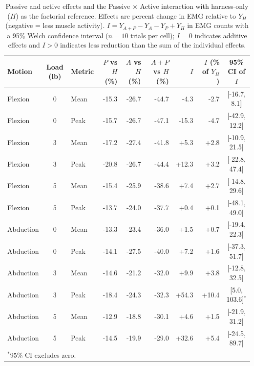 \begin{table}[H]
\centering
\caption{Passive and active effects and the Passive $\times$ Active interaction with harness-only ($H$) as the factorial reference. Effects are percent change in EMG relative to $Y_H$ (negative = less muscle activity). $I = Y_{A+P} - Y_{A} - Y_{P} + Y_{H}$ in EMG counts with a 95\% Welch confidence interval ($n = 10$ trials per cell); $I = 0$ indicates additive effects and $I > 0$ indicates less reduction than the sum of the individual effects.}
\label{tab:interaction}
\footnotesize
\setlength{\tabcolsep}{4pt}
\begin{tabular}{l c l r r r r r c}
\hline
Motion & Load (lb) & Metric & $P$ vs $H$ (\%) & $A$ vs $H$ (\%) & $A{+}P$ vs $H$ (\%) & $I$ & $I$ (\% of $Y_H$) & 95\% CI of $I$ \\
\hline
Flexion & 0 & Mean & -15.3 & -26.7 & -44.7 & -4.3 & -2.7 & [-16.7, 8.1] \\
Flexion & 0 & Peak & -15.7 & -26.7 & -47.1 & -15.3 & -4.7 & [-42.9, 12.2] \\
Flexion & 3 & Mean & -17.2 & -27.4 & -41.8 & +5.3 & +2.8 & [-10.9, 21.5] \\
Flexion & 3 & Peak & -20.8 & -26.7 & -44.4 & +12.3 & +3.2 & [-22.8, 47.4] \\
Flexion & 5 & Mean & -15.4 & -25.9 & -38.6 & +7.4 & +2.7 & [-14.8, 29.6] \\
Flexion & 5 & Peak & -13.7 & -24.0 & -37.7 & +0.4 & +0.1 & [-48.1, 49.0] \\
Abduction & 0 & Mean & -13.3 & -23.4 & -36.0 & +1.5 & +0.7 & [-19.4, 22.3] \\
Abduction & 0 & Peak & -14.1 & -27.5 & -40.0 & +7.2 & +1.6 & [-37.3, 51.7] \\
Abduction & 3 & Mean & -14.6 & -21.2 & -32.0 & +9.9 & +3.8 & [-12.8, 32.5] \\
Abduction & 3 & Peak & -18.4 & -24.3 & -32.3 & +54.3 & +10.4 & [5.0, 103.6]$^*$ \\
Abduction & 5 & Mean & -12.9 & -18.8 & -30.1 & +4.6 & +1.5 & [-21.9, 31.2] \\
Abduction & 5 & Peak & -14.5 & -19.9 & -29.0 & +32.6 & +5.4 & [-24.5, 89.7] \\
\hline
\multicolumn{9}{l}{$^*$95\% CI excludes zero.}\\
\end{tabular}
\end{table}

